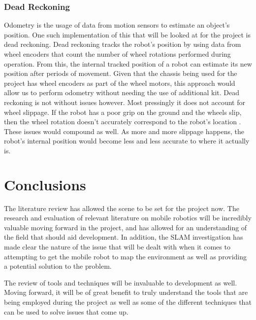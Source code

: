 				\subsection{Dead Reckoning}
				Odometry is the usage of data from motion sensors to estimate an object's position. One such implementation of this that will be looked at for the project is dead reckoning. Dead reckoning tracks the robot's position by using data from wheel encoders that count the number of wheel rotations performed during operation. From this, the internal tracked position of a robot can estimate its new position after periods of movement. Given that the chassis being used for the project has wheel encoders as part of the wheel motors, this approach would allow us to perform odometry without needing the use of additional kit. Dead reckoning is not without issues however. Most pressingly it does not account for wheel slippage. If the robot has a poor grip on the ground and the wheels slip, then the wheel rotation doesn't accurately correspond to the robot's location \citep{choset2001topological}. These issues would compound as well. As more and more slippage happens, the robot's internal position would become less and less accurate to where it actually is. 
				
		\chapter{Conclusions}
		The literature review has allowed the scene to be set for the project now. The research and evaluation of relevant literature on mobile robotics will be incredibly valuable moving forward in the project, and has allowed for an understanding of the field that should aid development. In addition, the SLAM investigation has made clear the nature of the issue that will be dealt with when it comes to attempting to get the mobile robot to map the environment as well as providing a potential solution to the problem. 
		
		The review of tools and techniques will be invaluable to development as well. Moving forward, it will be of great benefit to truly understand the tools that are being employed during the project as well as some of the different techniques that can be used to solve issues that come up.
	
	
	
		
				
	